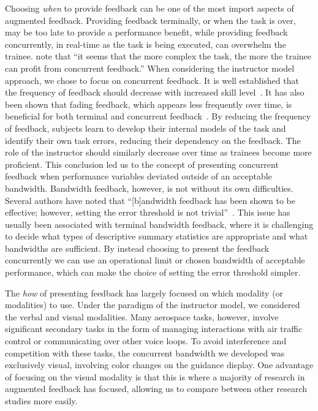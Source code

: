 Choosing \textit{when} to provide feedback can be one of the most import aspects of augmented feedback.
Providing feedback terminally, or when the task is over, may be too late to provide a performance benefit, while providing feedback concurrently, in real-time as the task is being executed, can overwhelm the trainee.
\citeauthor{sigrist_augmented_2013} note that ``it seems that the more complex the task, the more the trainee can profit from concurrent feedback.''
When considering the instructor model approach, we chose to focus on concurrent feedback.
It is well established that the frequency of feedback should decrease with increased skill level~\citep{doi:10.1080/00222899809601335, Wulf2002, doi:10.3200/JMBR.36.2.212-224, timmermans_technology-assisted_2009}.
It has also been shown that fading feedback, which appears less frequently over time, is beneficial for both terminal and concurrent feedback~\citep{CROWELL201178, KOVACS2011311}.
By reducing the frequency of feedback, subjects learn to develop their internal models of the task and identify their own task errors, reducing their dependency on the feedback.
The role of the instructor should similarly decrease over time as trainees become more proficient.
This conclusion led us to the concept of presenting concurrent feedback when performance variables deviated outside of an acceptable bandwidth.
Bandwidth feedback, however, is not without its own difficulties.
Several authors have noted that ``[b]andwidth feedback has been shown to be effective; however, setting the error threshold is not trivial''~\citep{timmermans_technology-assisted_2009, RIBEIRO2011231, sigrist_augmented_2013}.
This issue has usually been associated with terminal bandwidth feedback, where it is challenging to decide what types of descriptive summary statistics are appropriate and what bandwidths are sufficient.
By instead choosing to present the feedback concurrently we can use an operational limit or chosen bandwidth of acceptable performance, which can make the choice of setting the error threshold simpler.

The \textit{how} of presenting feedback has largely focused on which modality (or modalities) to use.
Under the paradigm of the instructor model, we considered the verbal and visual modalities.
Many aerospace tasks, however, involve significant secondary tasks in the form of managing interactions with air traffic control or communicating over other voice loops.
To avoid interference and competition with these tasks, the concurrent bandwidth we developed was exclusively visual, involving color changes on the guidance display.
One advantage of focusing on the visual modality is that this is where a majority of research in augmented feedback has focused, allowing us to compare between other research studies more easily.

